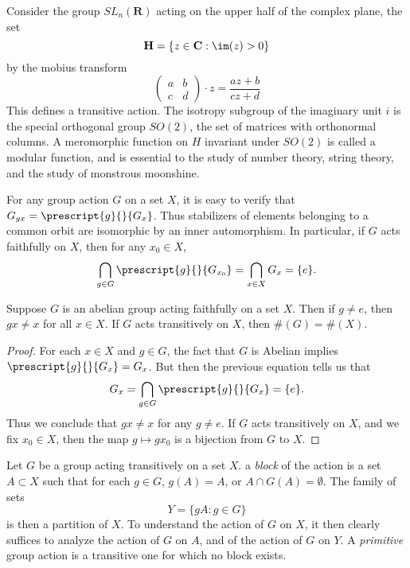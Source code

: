 \begin{example}
    Consider the group $SL_n(\mathbf{R})$ acting on the upper half of the complex plane, the set
    \[ \mathbf{H} = \{ z \in \mathbf{C} : \im(z) > 0 \} \]
    by the mobius transform
    \[\begin{pmatrix} a & b \\ c & d \end{pmatrix} \cdot z = \frac{az + b}{cz + d}\]
    This defines a transitive action. The isotropy subgroup of the imaginary unit $i$ is the special orthogonal group $SO(2)$, the set of matrices with orthonormal columns. A meromorphic function on $H$ invariant under $SO(2)$ is called a modular function, and is essential to the study of number theory, string theory, and the study of monstrous moonshine.
\end{example}

For any group action $G$ on a set $X$, it is easy to verify that $G_{gx} = \prescript{g}{}{G_x}$. Thus stabilizers of elements belonging to a common orbit are isomorphic by an inner automorphism. In particular, if $G$ acts faithfully on $X$, then for any $x_0 \in X$,
%
\[ \bigcap_{g \in G} \prescript{g}{}{G_{x_0}} = \bigcap_{x \in X} G_x = \{ e \}. \]

\begin{theorem}
    Suppose $G$ is an abelian group acting faithfully on a set $X$. Then if $g \neq e$, then $gx \neq x$ for all $x \in X$. If $G$ acts transitively on $X$, then $\#(G) = \#(X)$.
\end{theorem}
\begin{proof}
    For each $x \in X$ and $g \in G$, the fact that $G$ is Abelian implies $\prescript{g}{}{G_x} = G_x$. But then the previous equation tells us that
    \[ G_x = \bigcap_{g \in G} \prescript{g}{}{G_x} = \{ e \}. \]
    Thus we conclude that $gx \neq x$ for any $g \neq e$. If $G$ acts transitively on $X$, and we fix $x_0 \in X$, then the map $g \mapsto gx_0$ is a bijection from $G$ to $X$.
\end{proof}

Let $G$ be a group acting transitively on a set $X$. a \emph{block} of the action is a set $A \subset X$ such that for each $g \in G$, $g(A) = A$, or $A \cap G(A) = \emptyset$. The family of sets
%
\[ Y = \{ gA: g \in G \} \]
%
is then a partition of $X$. To understand the action of $G$ on $X$, it then clearly suffices to analyze the action of $G$ on $A$, and of the action of $G$ on $Y$. A \emph{primitive} group action is a transitive one for which no block exists.





